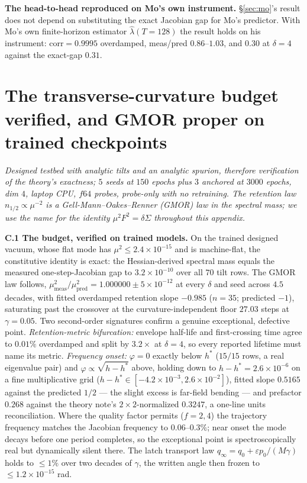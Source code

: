 \documentclass{article}
\begin{document}
\textbf{The head-to-head reproduced on Mo's own instrument.} \S\ref{sec:mo}'s result does not depend on substituting the exact Jacobian gap for Mo's predictor. With Mo's own finite-horizon estimator $\hat\lambda(T{=}128)$ the result holds on his instrument: $\mathrm{corr}=0.9995$ overdamped, meas/pred $0.86$--$1.03$, and $0.30$ at $\delta=4$ against the exact-gap $0.31$.

\section{The transverse-curvature budget verified, and GMOR proper on trained checkpoints}\label{app:gmor}

\emph{Designed testbed with analytic tilts and an analytic spurion, therefore verification of the theory's exactness; $5$ seeds at $150$ epochs plus $3$ anchored at $3000$ epochs, dim $4$, laptop CPU, $f64$ probes, probe-only with no retraining. The retention law $n_{1/2}\propto\mu^{-2}$ is a Gell-Mann--Oakes--Renner (GMOR) law in the spectral mass; we use the name for the identity $\mu^2F^2=\delta\Sigma$ throughout this appendix.}

\textbf{C.1 The budget, verified on trained models.} On the trained designed vacuum, whose flat mode has $\mu^2\le2.4{\times}10^{-15}$ and is machine-flat, the constitutive identity is exact: the Hessian-derived spectral mass equals the measured one-step-Jacobian gap to $3.2{\times}10^{-10}$ over all $70$ tilt rows. The GMOR law follows, $\mu^2_{\mathrm{meas}}/\mu^2_{\mathrm{pred}}=1.000000\pm5{\times}10^{-12}$ at every $\delta$ and seed across $4.5$ decades, with fitted overdamped retention slope $-0.985$ ($n=35$; predicted $-1$), saturating past the crossover at the curvature-independent floor $27.03$ steps at $\gamma=0.05$. Two second-order signatures confirm a genuine exceptional, defective point. \emph{Retention-metric bifurcation:} envelope half-life and first-crossing time agree to $0.01\%$ overdamped and split by $3.2\times$ at $\delta=4$, so every reported lifetime must name its metric. \emph{Frequency onset:} $\varphi=0$ exactly below $h^*$ ($15/15$ rows, a real eigenvalue pair) and $\varphi\propto\sqrt{h-h^*}$ above, holding down to $h-h^*=2.6{\times}10^{-6}$ on a fine multiplicative grid ($h-h^*\in[-4.2{\times}10^{-3},2.6{\times}10^{-2}]$), fitted slope $0.5165$ against the predicted $1/2$ --- the slight excess is far-field bending --- and prefactor $0.268$ against the theory note's $2\times2$-normalized $0.3247$, a one-line units reconciliation. Where the quality factor permits ($f=2,4$) the trajectory frequency matches the Jacobian frequency to $0.06$--$0.3\%$; near onset the mode decays before one period completes, so the exceptional point is spectroscopically real but dynamically silent there. The latch transport law $q_\infty=q_0+\varepsilon p_0/(M\gamma)$ holds to $\le1\%$ over two decades of $\gamma$, the written angle then frozen to $\le1.2{\times}10^{-15}$ rad.
\end{document}
